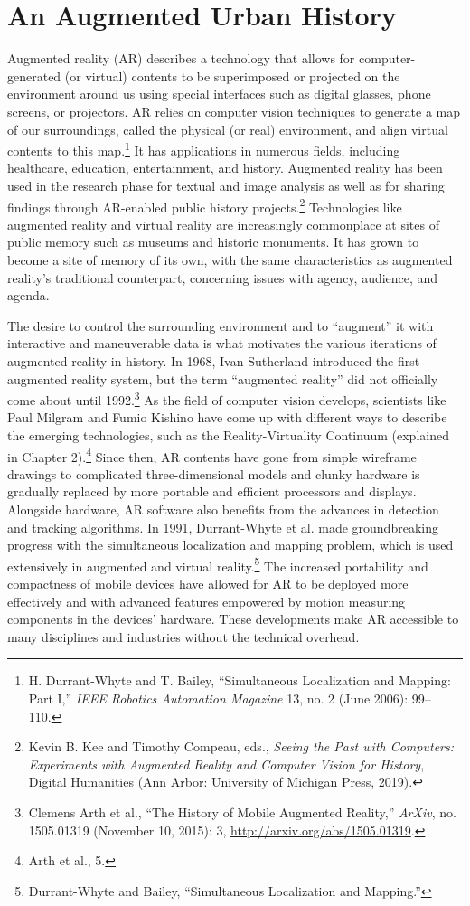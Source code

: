 \section{An Augmented Urban History}
Augmented reality (AR) describes a technology that allows for computer-generated (or virtual) contents to be superimposed or projected on the environment around us using special interfaces such as digital glasses, phone screens, or projectors. AR relies on computer vision techniques to generate a map of our surroundings, called the physical (or real) environment, and align virtual contents to this map.\footnote{H. Durrant-Whyte and T. Bailey, “Simultaneous Localization and Mapping: Part I,” \textit{IEEE Robotics Automation Magazine} 13, no. 2 (June 2006): 99–110.} It has applications in numerous fields, including healthcare, education, entertainment, and history. Augmented reality has been used in the research phase for textual and image analysis as well as for sharing findings through AR-enabled public history projects.\footnote{Kevin B. Kee and Timothy Compeau, eds., \textit{Seeing the Past with Computers: Experiments with Augmented Reality and Computer Vision for History}, Digital Humanities (Ann Arbor: University of Michigan Press, 2019).} Technologies like augmented reality and virtual reality are increasingly commonplace at sites of public memory such as museums and historic monuments. It has grown to become a site of memory of its own, with the same characteristics as augmented reality's traditional counterpart, concerning issues with agency, audience, and agenda.

The desire to control the surrounding environment and to “augment” it with interactive and maneuverable data is what motivates the various iterations of augmented reality in history. In 1968, Ivan Sutherland introduced the first augmented reality system, but the term “augmented reality” did not officially come about until 1992.\footnote{Clemens Arth et al., “The History of Mobile Augmented Reality,” \textit{ArXiv}, no. 1505.01319 (November 10, 2015): 3, \url{http://arxiv.org/abs/1505.01319}.} As the field of computer vision develops, scientists like Paul Milgram and Fumio Kishino have come up with different ways to describe the emerging technologies, such as the Reality-Virtuality Continuum (explained in Chapter 2).\footnote{Arth et al., 5.} Since then, AR contents have gone from simple wireframe drawings to complicated three-dimensional models and clunky hardware is gradually replaced by more portable and efficient processors and displays.  Alongside hardware, AR software also benefits from the advances in detection and tracking algorithms. In 1991, Durrant-Whyte et al. made groundbreaking progress with the simultaneous localization and mapping problem, which is used extensively in augmented and virtual reality.\footnote{Durrant-Whyte and Bailey, “Simultaneous Localization and Mapping.”} The increased portability and compactness of mobile devices have allowed for AR to be deployed more effectively and with advanced features empowered by motion measuring components in the devices’ hardware. These developments make AR accessible to many disciplines and industries without the technical overhead.

